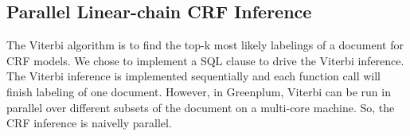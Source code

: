 \documentclass[11pt,letterpaper]{article}
\begin{document}



\subsection{Parallel Linear-chain CRF Inference}
 The Viterbi algorithm is to find the top-k most likely labelings of a document 
for CRF models. 
We chose to implement a SQL clause to drive the Viterbi inference. 
The Viterbi inference is implemented sequentially and each function call 
will finish labeling of one document.
However, in Greenplum, Viterbi can be run in parallel over different subsets 
of the document on a multi-core machine. So, the CRF inference is naivelly parallel. 



\end{document}
